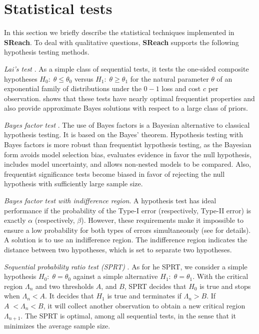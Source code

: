 
\section{Statistical tests}\label{apndx:stat}
In this section we briefly describe the statistical techniques implemented in {\bf SReach}.
To deal with qualitative questions, {\bf SReach} supports the following hypothesis testing methods.

\textit{Lai's test} \cite{lai1988nearly}.
As a simple class of sequential tests, it tests the one-sided composite hypotheses $H_0: \; \theta \leq \theta_0$ versus $H_1:\; \theta \geq \theta_1$ for the natural parameter $\theta$ of an exponential family of distributions under the $0-1$ loss and cost $c$ per observation. \cite{lai1988nearly} shows that these tests have nearly optimal frequentist properties and also provide approximate Bayes solutions with respect to a large class of priors. 

\textit{Bayes factor test} \cite{kass1995bayes}.
The use of Bayes factors is a Bayesian alternative to classical hypothesis testing. It is based on the Bayes' theorem. Hypothesis testing with Bayes factors is more robust than frequentist hypothesis testing, as the Bayesian form avoids model selection bias, evaluates evidence in favor the null hypothesis, includes model uncertainty, and allows non-nested models to be compared. Also, frequentist significance tests become biased in favor of rejecting the null hypothesis with sufficiently large sample size. 

\textit{Bayes factor test with indifference region}. 
A hypothesis test has ideal performance if the probability of the Type-I error (respectively, Type-II error) is exactly $\alpha$ (respectively, $\beta$). However, these requirements make it impossible to ensure a low probability for both types of errors simultaneously (see \cite{younes2005verification} for details). A solution is to use an indifference region. The indifference region indicates the distance between two hypotheses, which is set to separate two hypotheses.

\textit{Sequential probability ratio test (SPRT)} \cite{wald1945sequential}. 
As for he SPRT, we consider a simple hypothesis $H_0:\;\theta = \theta_0$ against a simple alternative $H_1:\;\theta = \theta_1$. With the critical region $\Lambda_n$ and two thresholds $A$, and $B$, SPRT decides that $H_0$ is true and stops when $\Lambda_n < A$. It decides that $H_1$ is true and terminates if $\Lambda_n > B$. If $A\; < \Lambda_n < B$, it will collect another observation to obtain a new critical region $\Lambda_{n+1}$. The SPRT is optimal, among all sequential tests, in the sense that it minimizes the average sample size.

